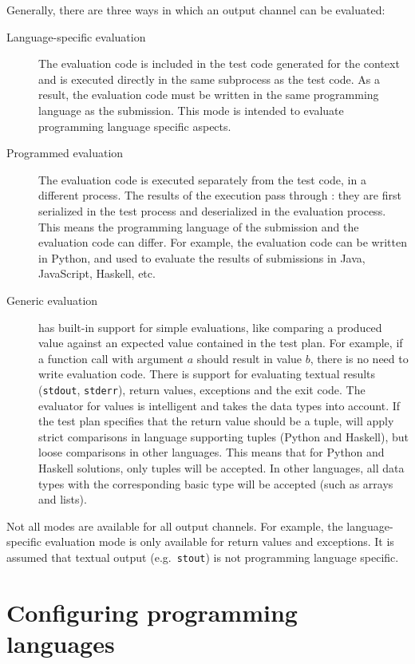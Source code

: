 \documentclass[5p,number]{elsarticle}
\begin{document}
    Generally, there are three ways in which an output channel can be evaluated:
    \begin{description}
        \item[Language-specific evaluation] The evaluation code is included in the test code generated for the context and is executed directly in the same subprocess as the test code.
        As a result, the evaluation code must be written in the same programming language as the submission.
        This mode is intended to evaluate programming language specific aspects.
        \item[Programmed evaluation] The evaluation code is executed separately from the test code, in a different process.
        The results of the execution pass through \tested{}: they are first serialized in the test process and deserialized in the evaluation process.
        This means the programming language of the submission and the evaluation code can differ.
        For example, the evaluation code can be written in Python, and used to evaluate the results of submissions in Java, JavaScript, Haskell, etc.
        \item[Generic evaluation] \tested{} has built-in support for simple evaluations, like comparing a produced value against an expected value contained in the test plan.
        For example, if a function call with argument $a$ should result in value $b$, there is no need to write evaluation code.
        There is support for evaluating textual results (\texttt{stdout}, \texttt{stderr}), return values, exceptions and the exit code.
        The evaluator for values is intelligent and takes the data types into account.
        If the test plan specifies that the return value should be a tuple, \tested{} will apply strict comparisons in language supporting tuples (Python and Haskell), but loose comparisons in other languages.
        This means that for Python and Haskell solutions, only tuples will be accepted.
        In other languages, all data types with the corresponding basic type will be accepted (such as arrays and lists).
    \end{description}

    Not all modes are available for all output channels.
    For example, the language-specific evaluation mode is only available for return values and exceptions.
    It is assumed that textual output (e.g.\ \texttt{stout}) is not programming language specific.

    \section{Configuring programming languages}\label{sec:configuring-programming-languages}
\end{document}
